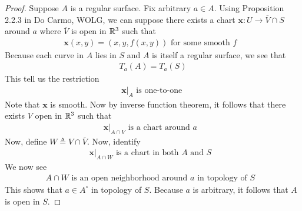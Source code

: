 \documentclass{report}
\begin{document}
\begin{proof}
Suppose $A$ is a regular surface. Fix arbitrary $a\in A$. Using Proposition 2.2.3 in Do Carmo, WOLG, we can suppose there exists a chart $\textbf{x}:U\rightarrow \overline{V}\cap S$ around $a$ where $\overline{V}$ is open in $\mathbb{R}^3$ such that 
\begin{align*}
\textbf{x}(x,y)=(x,y,f(x,y))\text{ for some smooth $f$ }
\end{align*}
Because each curve in $A$ lies in  $S$ and  $A$ is itself a regular surface, we see that 
\begin{align*}
T_a(A)=T_a(S)
\end{align*}
This tell us the restriction
\begin{align*}
\textbf{x}|_A\text{ is one-to-one }
\end{align*}
Note that $\textbf{x}$ is smooth. Now by inverse function theorem, it follows that there exists $V$ open in $\mathbb{R}^3$ such that 
 \begin{align*}
\textbf{x}|_{A\cap V}\text{ is a chart around $a$ }
\end{align*}
Now, define $W\triangleq V\cap \overline{V}$. Now, identify 
\begin{align*}
  \textbf{x}|_{A\cap W}\text{ is a chart in both $A$ and  $S$ }
\end{align*}
We now see 
\begin{align*}
A\cap W\text{ is an open neighborhood around $a$ in topology of $S$ }
\end{align*}
This shows that $a \in A^\circ $ in topology of $S$. Because $a$ is arbitrary, it follows that $A$ is open in $S$. 
\end{proof}
\end{document}
